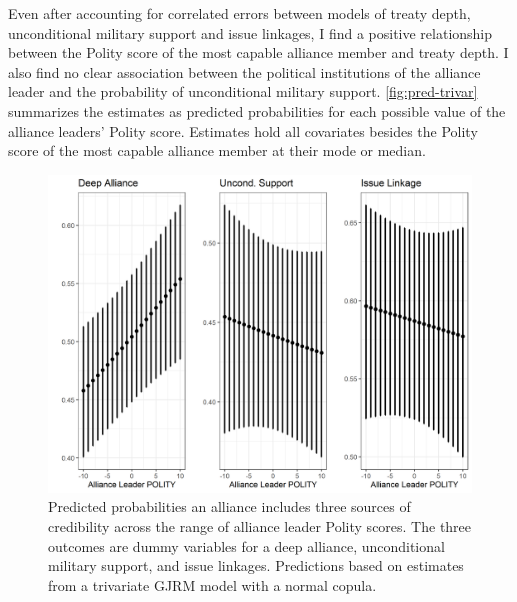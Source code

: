 \documentclass[12pt]{article}
\begin{document}
Even after accounting for correlated errors between models of treaty depth, unconditional military support and issue linkages, I find a positive relationship between the Polity score of the most capable alliance member and treaty depth. 
I also find no clear association between the political institutions of the alliance leader and the probability of unconditional military support. 
\autoref{fig:pred-trivar} summarizes the estimates as predicted probabilities for each possible value of the alliance leaders' Polity score. 
Estimates hold all covariates besides the Polity score of the most capable alliance member at their mode or median.  


\begin{figure}
\includegraphics[width=.95\textwidth]{pred-trivar.png}  
\caption{Predicted probabilities an alliance includes three sources of credibility across the range of alliance leader Polity scores. The three outcomes are dummy variables for a deep alliance, unconditional military support, and issue linkages. Predictions based on estimates from a trivariate GJRM model with a normal copula.}
\label{fig:pred-trivar}
\end{figure}




\newpage

\singlespace
 
 
\end{document}
